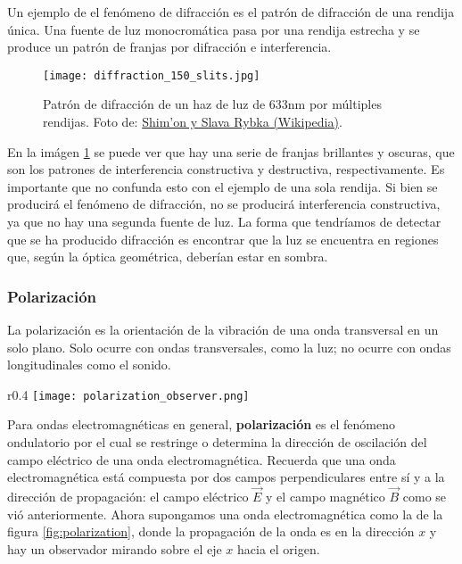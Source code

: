 Un ejemplo de el fenómeno de difracción es el patrón de difracción de una rendija única. Una fuente de luz monocromática pasa por una rendija estrecha y se produce un patrón de franjas por difracción e interferencia.

\begin{figure}[ht]
  \centering
  \texttt{[image: diffraction\_150\_slits.jpg]}
  \caption{Patrón de difracción de un haz de luz de 633nm por múltiples rendijas. Foto de: \href{https://commons.wikimedia.org/w/index.php?curid=6938945}{Shim'on y Slava Rybka (Wikipedia)}.}
  \label{fig:diffraction_150_slits}
\end{figure}

En la imágen \ref{fig:diffraction_150_slits} se puede ver que hay una serie de franjas brillantes y oscuras, que son los patrones de interferencia constructiva y destructiva, respectivamente. Es importante que no confunda esto con el ejemplo de una sola rendija. Si bien se producirá el fenómeno de difracción, no se producirá interferencia constructiva, ya que no hay una segunda fuente de luz. La forma que tendríamos de detectar que se ha producido difracción es encontrar que la luz se encuentra en regiones que, según la óptica geométrica, deberían estar en sombra.

\subsubsection{Polarización}

La polarización es la orientación de la vibración de una onda transversal en un solo plano. Solo ocurre con ondas transversales, como la luz; no ocurre con ondas longitudinales como el sonido.

\begin{wrapfigure}{r}{0.4\textwidth}
  \centering
  \texttt{[image: polarization\_observer.png]}
  \caption{Posición del observador con respecto a la onda electromagnética.}
  \label{fig:polarization}
\end{wrapfigure}
Para ondas electromagnéticas en general, \textbf{polarización} es el fenómeno ondulatorio por el cual se restringe o determina la dirección de oscilación del campo eléctrico de una onda electromagnética. Recuerda que una onda electromagnética está compuesta por dos campos perpendiculares entre sí y a la dirección de propagación: el campo eléctrico \(\vec{E}\) y el campo magnético \(\vec{B}\) como se vió anteriormente. Ahora supongamos una onda electromagnética como la de la figura \ref{fig:polarization}, donde la propagación de la onda es en la dirección \(x\) y hay un observador mirando sobre el eje \(x\) hacia el origen.

